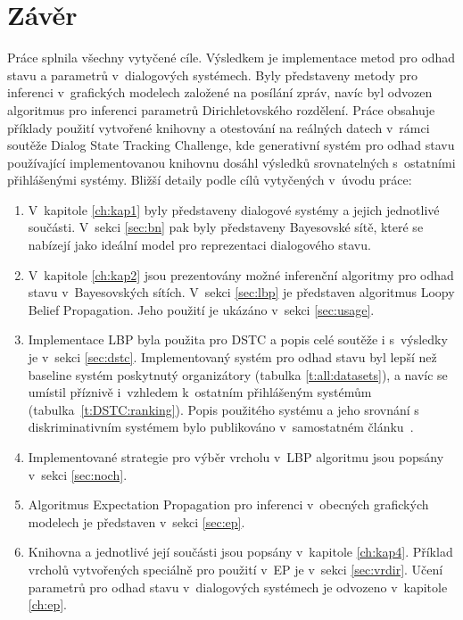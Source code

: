 \chapter*{Závěr}

Práce splnila všechny vytyčené cíle.
Výsledkem je implementace metod pro odhad stavu a parametrů v~dialogových systémech.
Byly představeny metody pro inferenci v~grafických modelech založené na posílání zpráv, navíc byl odvozen algoritmus pro inferenci parametrů Dirichletovského rozdělení.
Práce obsahuje příklady použití vytvořené knihovny a otestování na reálných datech v~rámci soutěže Dialog State Tracking Challenge, kde generativní systém pro odhad stavu používající implementovanou knihovnu dosáhl výsledků srovnatelných s~ostatními přihlášenými systémy.
Bližší detaily podle cílů vytyčených v~úvodu práce:
\begin{enumerate}

\item V~kapitole \ref{ch:kap1} byly představeny dialogové systémy a jejich jednotlivé součásti.
V~sekci \ref{sec:bn} pak byly představeny Bayesovské sítě, které se nabízejí jako ideální model pro reprezentaci dialogového stavu.

\item V~kapitole \ref{ch:kap2} jsou prezentovány možné inferenční algoritmy pro odhad stavu v~Bayesovských sítích.
V~sekci \ref{sec:lbp} je představen algoritmus Loopy Belief Propagation.
Jeho použití je ukázáno v~sekci \ref{sec:usage}.

\item Implementace LBP byla použita pro DSTC a popis celé soutěže i s~výsledky je v~sekci \ref{sec:dstc}.
Implementovaný systém pro odhad stavu byl lepší než baseline systém poskytnutý organizátory (tabulka \ref{t:all:datasets}), a navíc se umístil příznivě i~vzhledem k~ostatním přihlášeným systémům (tabulka~\ref{t:DSTC:ranking}).
Popis použitého systému a jeho srovnání s diskriminativním systémem bylo publikováno v~samostatném článku~\cite{zilka2013}.

\item Implementované strategie pro výběr vrcholu v~LBP algoritmu jsou popsány v~sekci \ref{sec:noch}.

\item Algoritmus Expectation Propagation pro inferenci v~obecných grafických modelech je představen v~sekci \ref{sec:ep}.

\item Knihovna a jednotlivé její součásti jsou popsány v~kapitole \ref{ch:kap4}.
Příklad vrcholů vytvořených speciálně pro použití v~EP je v~sekci \ref{sec:vrdir}.
Učení parametrů pro odhad stavu v~dialogových systémech je odvozeno v~kapitole \ref{ch:ep}.
\end{enumerate}

